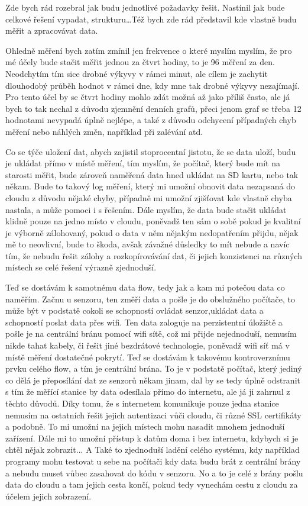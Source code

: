 Zde bych rád rozebral jak budu jednotlivé požadavky řešit. Nastínil jak bude celkové řešení vypadat, strukturu\ldots Též 
bych zde rád představil kde vlastně budu měřit a zpracovávat data.

Ohledně měření bych zatím zmínil jen frekvence o které myslím myslím, že pro mé účely bude stačit měřit jednou za čtvrt 
hodiny, to je 96 měření za den. Neodchytím tím sice drobné výkyvy v rámci minut, ale cílem je zachytit dlouhodobý průběh 
hodnot v rámci dne, kdy mne tak drobné výkyvy nezajímají. Pro tento účel by se čtvrt hodiny mohlo zdát možná až jako 
příliš často, ale já bych to tak nechal z důvodu zjemnění denních grafů, přeci jenom graf se třeba 12 hodnotami nevypadá 
úplně nejlépe, a také z důvodu odchycení případných chyb měření nebo náhlých změn, například při zalévání atd.

Co se týče uložení dat, abych zajistil stoprocentní jistotu, že se data uloží, budu je ukládat přímo v místě měření, tím 
myslím, že počítač, který bude mít na starosti měřit, bude zároveň naměřená data hned ukládat na SD kartu, nebo tak 
někam. Bude to takový log měření, který mi umožní obnovit data nezapsaná do cloudu z důvodu nějaké chyby, případně mi 
umožní zjišťovat kde vlastně chyba nastala, a může pomoci i s řešením. Dále myslím, že data bude stačit ukládat klidně 
pouze na jedno místo v cloudu, poněvadž ten sám o sobě pokud je kvalitní je výborně zálohovaný, pokud o data v něm 
nějakým nedopatřením přijdu, nějak mě to neovlivní, bude to škoda, avšak závažné důsledky to mít nebude a navíc tím, že 
nebudu řešit zálohy a rozkopírovávání dat, či jejich konzistenci na různých místech se celé řešení výrazně zjednoduší.

Teď se dostávám k samotnému data flow, tedy jak a kam mi potečou data co naměřím. Začnu u senzoru, ten změří data 
a pošle je do obslužného počítače, to může být v podstatě cokoli se schopností ovládat senzor,ukládat data a schopností 
poslat data přes wifi. Ten data zaloguje na perzistentní úložiště a pošle je na centrální bránu pomocí wifi sítě, což mi 
přijde nejednoduší, nemusím nikde tahat kabely, či řešit jiné bezdrátové technologie, poněvadž wifi síť má v místě 
měření dostatečné pokrytí. Teď se dostávám k takovému kontroverznímu prvku celého flow, a tím je centrální brána. To je 
v podstatě počítač, který jediný co dělá je přeposílání dat ze senzorů někam jinam, dal by se tedy úplně odstranit s tím 
že měřící stanice by data odesílala přímo do internetu, ale já ji zahrnul z těchto důvodů. Díky tomu, že s internetem 
komunikuje pouze jedna stanice nemusím na ostatních řešit jejich autentizaci vůči cloudu, či různé SSL certifikáty 
a podobně. To mi umožní na jejich místech mohu nasadit mnohem jednoduší zařízení. Dále mi to umožní přístup k datům doma 
i bez internetu, kdybych si je chtěl nějak zobrazit... A Také to zjednoduší ladění celého systému, kdy například 
programy mohu testovat u sebe na počítači kdy data budu brát z centrální brány a nebudu muset vůbec zasahovat do kódu 
v senzoru. No a to je celé z brány pošlu data do cloudu a tam jejich cesta končí, pokud tedy vynechám cestu z cloudu za 
účelem jejich zobrazení.

